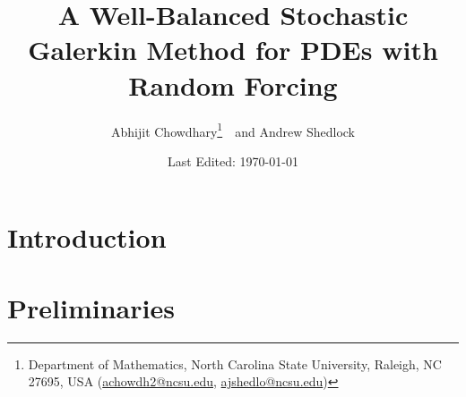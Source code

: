 \documentclass[12pt]{article}
\begin{document}
\title{
  A Well-Balanced Stochastic Galerkin Method for PDEs with Random Forcing
}
\author{%
  Abhijit Chowdhary\footnote{%
    Department of Mathematics, North Carolina State University, Raleigh, NC
    27695, USA (\url{achowdh2@ncsu.edu}, \url{ajshedlo@ncsu.edu})
  }\ \ 
  and Andrew Shedlock\footnotemark[1]
}
\date{Last Edited: \today}
\maketitle
\tableofcontents

\clearpage

\section{Introduction}
\cite{Jin2015}

\section{Preliminaries}

\end{document}

